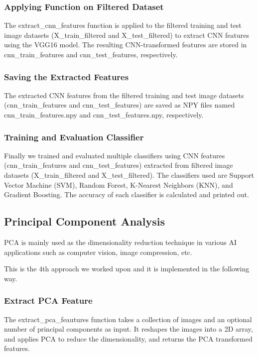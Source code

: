 \documentclass[a4paper]{article}
\theoremstyle{plain}
\theoremstyle{definition}
\begin{document}
        \subsubsection{Applying Function on Filtered Dataset}
        The extract\_cnn\_features function is applied to the filtered training and test image datasets (X\_train\_filtered and X\_test\_filtered) to extract CNN features using the VGG16 model. The resulting CNN-transformed features are stored in cnn\_train\_features and cnn\_test\_features, respectively.

        \subsubsection{Saving the Extracted Features}
        The extracted CNN features from the filtered training and test image datasets (cnn\_train\_features and cnn\_test\_features) are saved as NPY files named cnn\_train\_features.npy and cnn\_test\_features.npy, respectively.

        \subsubsection{Training and Evaluation Classifier}
        Finally we trained and evaluated multiple classifiers using CNN features (cnn\_train\_features and cnn\_test\_features) extracted from filtered image datasets (X\_train\_filtered and X\_test\_filtered). The classifiers used are Support Vector Machine (SVM), Random Forest, K-Nearest Neighbors (KNN), and Gradient Boosting. The accuracy of each classifier is calculated and printed out.

        \subsection{Principal Component Analysis}
        PCA is mainly used as the dimensionality reduction technique in various AI applications such as computer vision, image compression, etc.\bigskip

	This is the 4th approach we worked upon and it is implemented in the following way.

        \subsubsection{Extract PCA Feature}
	The extract\_pca\_feautures function takes a collection of images and an optional number of principal components as input. It reshapes the images into a 2D array, and applies PCA to reduce the dimensionality, and returns the PCA transformed features.
        
\end{document}
